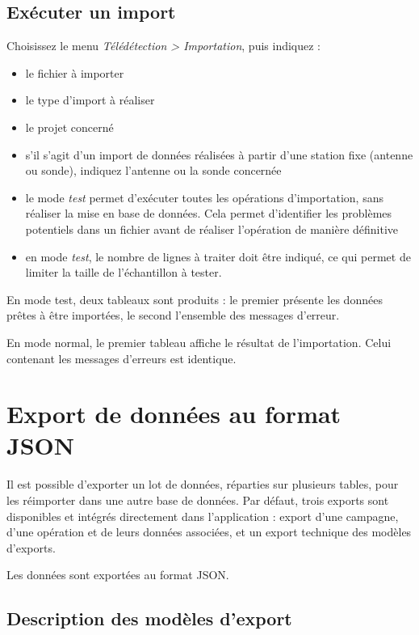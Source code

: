 \subsection{Exécuter un import}

Choisissez le menu \textit{Télédétection > Importation}, puis indiquez :
\begin{itemize}
	\item le fichier à importer
	\item le type d'import à réaliser
	\item le projet concerné
	\item s'il s'agit d'un import de données réalisées à partir d'une station fixe (antenne ou sonde), indiquez l'antenne ou la sonde concernée
	\item le mode \textit{test} permet d'exécuter toutes les opérations d'importation, sans réaliser la mise en base de données. Cela permet d'identifier les problèmes potentiels dans un fichier avant de réaliser l'opération de manière définitive
	\item en mode \textit{test}, le nombre de lignes à traiter doit être indiqué, ce qui permet de limiter la taille de l'échantillon à tester.
\end{itemize}

En mode test, deux tableaux sont produits : le premier présente les données prêtes à être importées, le second l'ensemble des messages d'erreur.

En mode normal, le premier tableau affiche le résultat de l'importation. Celui contenant les messages d'erreurs est identique.

\section{Export de données au format JSON}

Il est possible d'exporter un lot de données, réparties sur plusieurs tables, pour les réimporter dans une autre base de données. Par défaut, trois exports sont disponibles et intégrés directement dans l'application : export d'une campagne, d'une opération et de leurs données associées, et un export technique des modèles d'exports.

Les données sont exportées au format JSON.

\subsection{Description des modèles d'export}

